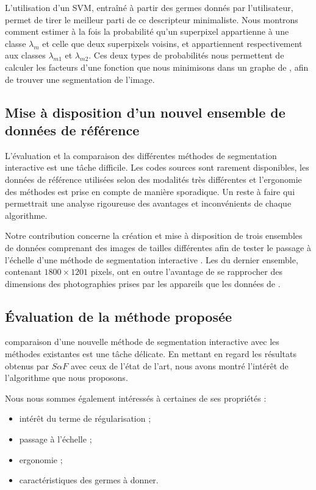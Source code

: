 L'utilisation d'un SVM, entraîné à partir des germes donnés par l'utilisateur, permet de tirer le meilleur parti de ce descripteur minimaliste. Nous montrons comment estimer à la fois la probabilité qu'un superpixel  appartienne à une classe $\lambda_{m}$ et celle que deux superpixels voisins,   et  appartiennent respectivement aux classes $\lambda_{m1}$ et $\lambda_{m2}$. Ces deux types de probabilités nous permettent de calculer les facteurs d'une fonction que nous minimisons dans un graphe de , afin de trouver une segmentation  de l'image.

\subsection{Mise à disposition d'un nouvel ensemble de données de référence}
L'évaluation et la comparaison des différentes méthodes de segmentation interactive est une tâche difficile. Les codes sources sont rarement disponibles, les données de référence  utilisées selon des modalités très différentes et l'ergonomie des méthodes est prise en compte de manière sporadique. Un  reste à faire qui permettrait une analyse rigoureuse des avantages et inconvénients de chaque algorithme.

Notre contribution concerne la création et  mise à disposition de trois ensembles de données comprenant des images de tailles différentes afin de tester le passage à l'échelle d'une méthode de segmentation interactive . Les  du dernier ensemble, contenant $1800 \times 1201$ pixels, ont en outre l'avantage de se rapprocher  des dimensions des photographies prises par les appareils  que les données de  \cite{mcguinness2010comparative,rother2004grabcut, santner2010interactive}.


\subsection{Évaluation de la méthode proposée}
 comparaison d'une nouvelle méthode de segmentation interactive avec les méthodes existantes est une tâche délicate. En mettant en regard les résultats obtenus par $S \alpha F$ avec ceux de l'état de l'art, nous avons montré l'intérêt de l'algorithme que nous proposons. 

Nous nous sommes également intéressés à certaines de ses propriétés :
\begin{itemize}
\item intérêt du terme de régularisation ;
\item passage à l'échelle ;
\item ergonomie ;
\item caractéristiques des germes à donner. 
\end{itemize}

